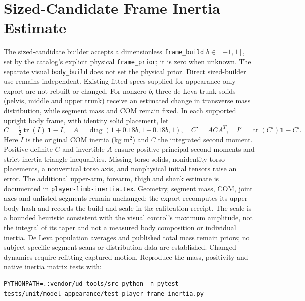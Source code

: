 \documentclass{article}
\begin{document}
\section{Sized-Candidate Frame Inertia Estimate}
The sized-candidate builder accepts a dimensionless \texttt{frame\_build}
$b\in[-1,1]$, set by the catalog's explicit physical \texttt{frame\_prior}; it
is zero when unknown. The separate visual \texttt{body\_build} does not set
the physical prior. Direct sized-builder use remains independent. Existing fitted specs supplied for appearance-only export
are not rebuilt or changed. For nonzero $b$, three de Leva trunk solids
(pelvis, middle and upper trunk) receive an estimated change in transverse
mass distribution, while segment mass and COM remain fixed. In each supported
upright body frame, with identity solid placement, let
\[ C=\tfrac{1}{2}\operatorname{tr}(I)\,\mathbf{1}-I,\quad
 A=\operatorname{diag}(1+0.18b,1+0.18b,1),\quad
 C'=ACA^T,\quad I'=\operatorname{tr}(C')\mathbf{1}-C'. \]
Here $I$ is the original COM inertia (kg m$^2$) and $C$ the integrated second
moment. Positive-definite $C$ and invertible $A$ ensure positive principal
second moments and strict inertia triangle inequalities. Missing torso solids,
nonidentity torso placements, a nonvertical torso axis, and nonphysical initial
tensors raise an error. The additional upper-arm, forearm, thigh and shank estimate is
documented in \texttt{player-limb-inertia.tex}. Geometry, segment mass, COM,
joint axes and unlisted segments remain unchanged; the export recomputes its upper-body hash and records the
build and scale in the calibration receipt. The scale is a bounded heuristic
consistent with the visual control's maximum amplitude, not the integral of
its taper and not a measured body composition or individual inertia. De Leva
population averages and published total mass remain priors; no subject-specific
segment scans or distribution data are established. Changed dynamics require
refitting captured motion. Reproduce the mass, positivity and native inertia
matrix tests with:
\begin{verbatim}
PYTHONPATH=.:vendor/ud-tools/src python -m pytest tests/unit/model_appearance/test_player_frame_inertia.py
\end{verbatim}
\end{document}
